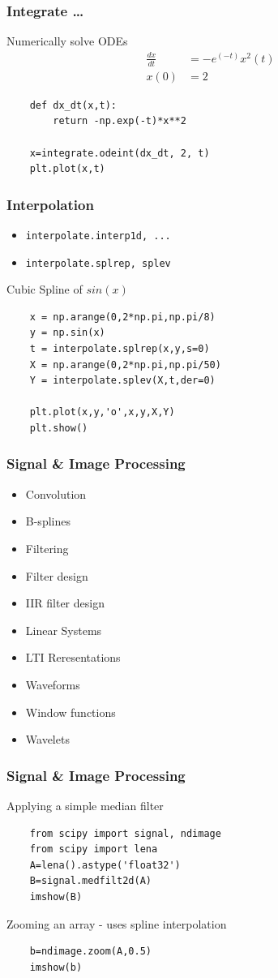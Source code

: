 \documentclass[14pt,compress]{beamer}
\newcommand{\typ}[1]{\lstinline{#1}}
\begin{document}
\begin{frame}[fragile]
  \frametitle{Integrate \ldots}
  Numerically solve ODEs\\
  \begin{align*}
  \frac{dx}{dt}&=-e^{(-t)}x^2(t)\\ 
           x(0)&=2    
  \end{align*}
  \begin{lstlisting}
    def dx_dt(x,t):
        return -np.exp(-t)*x**2

    x=integrate.odeint(dx_dt, 2, t)
    plt.plot(x,t)
  \end{lstlisting}
\end{frame}

\begin{frame}[fragile]
  \frametitle{Interpolation}
  \begin{itemize}
    \item \typ{interpolate.interp1d, ...}
    \item \typ{interpolate.splrep, splev}
  \end{itemize}
  Cubic Spline of $sin(x)$
  \begin{lstlisting}
    x = np.arange(0,2*np.pi,np.pi/8)
    y = np.sin(x)
    t = interpolate.splrep(x,y,s=0)
    X = np.arange(0,2*np.pi,np.pi/50)
    Y = interpolate.splev(X,t,der=0)

    plt.plot(x,y,'o',x,y,X,Y)
    plt.show()
  \end{lstlisting}
\end{frame}

\begin{frame}[fragile]
  \frametitle{Signal \& Image Processing}
    \begin{itemize}
     \item Convolution
     \item B-splines
     \item Filtering
     \item Filter design
     \item IIR filter design
     \item Linear Systems
     \item LTI Reresentations
     \item Waveforms
     \item Window functions
     \item Wavelets
    \end{itemize}
\end{frame}

\begin{frame}[fragile]
  \frametitle{Signal \& Image Processing}
  Applying a simple median filter
  \begin{lstlisting}
    from scipy import signal, ndimage
    from scipy import lena
    A=lena().astype('float32')
    B=signal.medfilt2d(A)
    imshow(B)
  \end{lstlisting}
  Zooming an array - uses spline interpolation
  \begin{lstlisting}
    b=ndimage.zoom(A,0.5)
    imshow(b)
  \end{lstlisting}

\end{frame}
\end{document}
